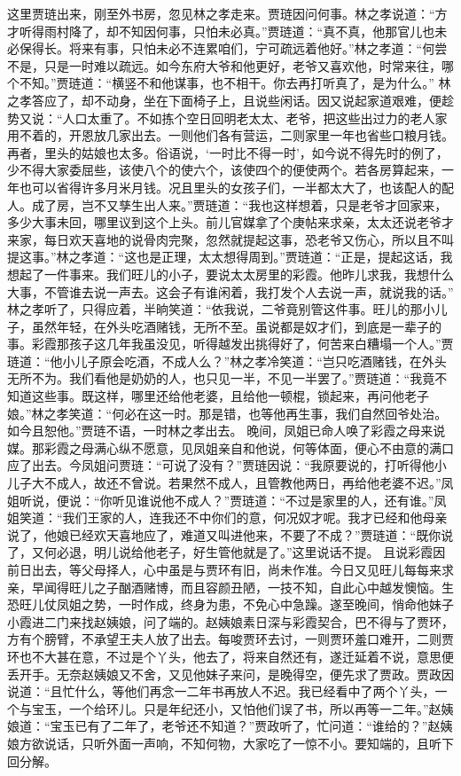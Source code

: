 \documentclass[12pt,oneside]{book}
\begin{document}
这里贾琏出来，刚至外书房，忽见林之孝走来。贾琏因问何事。林之孝说道：“方才听得雨村降了，却不知因何事，只怕未必真。”贾琏道：“真不真，他那官儿也未必保得长。将来有事，只怕未必不连累咱们，宁可疏远着他好。”林之孝道：“何尝不是，只是一时难以疏远。如今东府大爷和他更好，老爷又喜欢他，时常来往，哪个不知。”贾琏道：“横竖不和他谋事，也不相干。你去再打听真了，是为什么。”
林之孝答应了，却不动身，坐在下面椅子上，且说些闲话。因又说起家道艰难，便趁势又说：“人口太重了。不如拣个空日回明老太太、老爷，把这些出过力的老人家用不着的，开恩放几家出去。一则他们各有营运，二则家里一年也省些口粮月钱。再者，里头的姑娘也太多。俗语说，‘一时比不得一时’，如今说不得先时的例了，少不得大家委屈些，该使八个的使六个，该使四个的便使两个。若各房算起来，一年也可以省得许多月米月钱。况且里头的女孩子们，一半都太大了，也该配人的配人。成了房，岂不又孳生出人来。”贾琏道：“我也这样想着，只是老爷才回家来，多少大事未回，哪里议到这个上头。前儿官媒拿了个庚帖来求亲，太太还说老爷才来家，每日欢天喜地的说骨肉完聚，忽然就提起这事，恐老爷又伤心，所以且不叫提这事。”林之孝道：“这也是正理，太太想得周到。”贾琏道：“正是，提起这话，我想起了一件事来。我们旺儿的小子，要说太太房里的彩霞。他昨儿求我，我想什么大事，不管谁去说一声去。这会子有谁闲着，我打发个人去说一声，就说我的话。”
林之孝听了，只得应着，半晌笑道：“依我说，二爷竟别管这件事。旺儿的那小儿子，虽然年轻，在外头吃酒赌钱，无所不至。虽说都是奴才们，到底是一辈子的事。彩霞那孩子这几年我虽没见，听得越发出挑得好了，何苦来白糟塌一个人。”贾琏道：“他小儿子原会吃酒，不成人么？”林之孝冷笑道：“岂只吃酒赌钱，在外头无所不为。我们看他是奶奶的人，也只见一半，不见一半罢了。”贾琏道：“我竟不知道这些事。既这样，哪里还给他老婆，且给他一顿棍，锁起来，再问他老子娘。”林之孝笑道：“何必在这一时。那是错，也等他再生事，我们自然回爷处治。如今且恕他。”贾琏不语，一时林之孝出去。
晚间，凤姐已命人唤了彩霞之母来说媒。那彩霞之母满心纵不愿意，见凤姐亲自和他说，何等体面，便心不由意的满口应了出去。今凤姐问贾琏：“可说了没有？”贾琏因说：“我原要说的，打听得他小儿子大不成人，故还不曾说。若果然不成人，且管教他两日，再给他老婆不迟。”凤姐听说，便说：“你听见谁说他不成人？”贾琏道：“不过是家里的人，还有谁。”凤姐笑道：“我们王家的人，连我还不中你们的意，何况奴才呢。我才已经和他母亲说了，他娘已经欢天喜地应了，难道又叫进他来，不要了不成？”贾琏道：“既你说了，又何必退，明儿说给他老子，好生管他就是了。”这里说话不提。
且说彩霞因前日出去，等父母择人，心中虽是与贾环有旧，尚未作准。今日又见旺儿每每来求亲，早闻得旺儿之子酗酒赌博，而且容颜丑陋，一技不知，自此心中越发懊恼。生恐旺儿仗凤姐之势，一时作成，终身为患，不免心中急躁。遂至晚间，悄命他妹子小霞进二门来找赵姨娘，问了端的。赵姨娘素日深与彩霞契合，巴不得与了贾环，方有个膀臂，不承望王夫人放了出去。每唆贾环去讨，一则贾环羞口难开，二则贾环也不大甚在意，不过是个丫头，他去了，将来自然还有，遂迁延着不说，意思便丢开手。无奈赵姨娘又不舍，又见他妹子来问，是晚得空，便先求了贾政。贾政因说道：“且忙什么，等他们再念一二年书再放人不迟。我已经看中了两个丫头，一个与宝玉，一个给环儿。只是年纪还小，又怕他们误了书，所以再等一二年。”赵姨娘道：“宝玉已有了二年了，老爷还不知道？”贾政听了，忙问道：“谁给的？”赵姨娘方欲说话，只听外面一声响，不知何物，大家吃了一惊不小。要知端的，且听下回分解。
 
\end{document}
